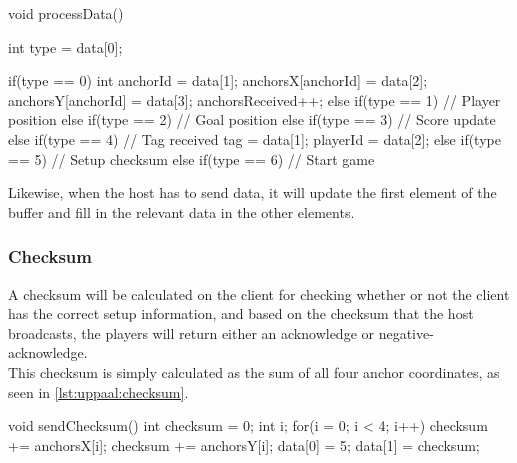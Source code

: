 \begin{uppaalcode}[caption={Processing Data in \uppaal model}, captionpos=b,label={lst:uppaal:processData}]
void processData(){
    int type = data[0];
    
    if(type == 0){
        int anchorId = data[1];
        anchorsX[anchorId] = data[2];
        anchorsY[anchorId] = data[3];
        anchorsReceived++;
    } else if(type == 1){
        // Player position
    } else if(type == 2){
        // Goal position
    } else if(type == 3){
        // Score update
    } else if(type == 4){
        // Tag received
        tag = data[1];
        playerId = data[2];
    } else if(type == 5){
        // Setup checksum
    } else if(type == 6){
        // Start game
    }
}
\end{uppaalcode}
\noindent
Likewise, when the host has to send data, it will update the first element of the buffer and fill in the relevant data in the other elements.

\subsubsection{Checksum}
A checksum will be calculated on the client for checking whether or not the client has the correct setup information, and based on the checksum that the host broadcasts, the players will return either an acknowledge or negative-acknowledge.
\\
This checksum is simply calculated as the sum of all four anchor coordinates, as seen in \autoref{lst:uppaal:checksum}.

\begin{uppaalcode}[caption={Calculating checksum in \uppaal model}, captionpos=b,label={lst:uppaal:checksum}]
    void sendChecksum(){
        int checksum = 0;
        int i;
        for(i = 0; i < 4; i++){
            checksum += anchorsX[i];
            checksum += anchorsY[i];
        }
        data[0] = 5;
        data[1] = checksum;
    }
\end{uppaalcode}

